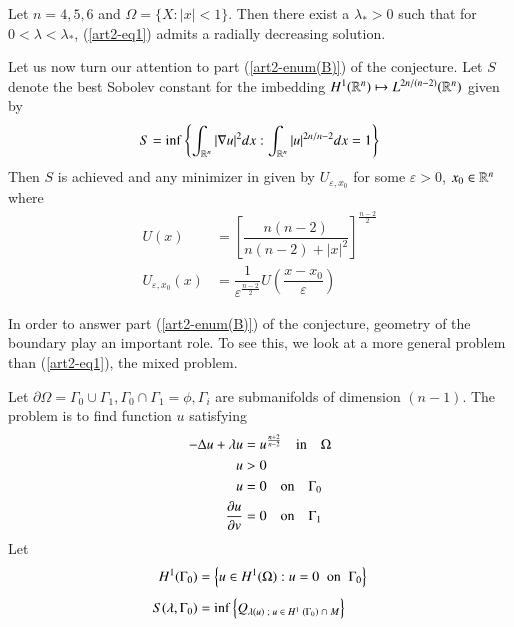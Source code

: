 \begin{theorem}\label{art2-thm3}
Let $n= 4, 5, 6$ and $\Omega = \{X: |x|< 1\}$. Then there exist a $\lambda_{*} > 0$ such that for $0 < \lambda < \lambda_{*}$, (\ref{art2-eq1}) admits a radially decreasing solution.

Let us now turn our attention to part (\ref{art2-enum(B)}) of the conjecture. Let $S$ denote the best Sobolev constant for the imbedding $H^{1}(\mathbb{R}^{n}) \mapsto  L^{2n/(n-2)}(\mathbb{R}^{n})$ given by  
\begin{equation}
S = {\rm inf}\left\{ \int_{\mathbb{R}^{n}} |\nabla u|^{2}dx: \int_{\mathbb{R}^{n}} |u|^{2n/n-2}dx =1 \right \}\label{art2-eq4}
\end{equation}
Then $S$ is achieved and any minimizer in given by $U_{\varepsilon, x_{0}}$ for some $\varepsilon > 0$, $x_{0} \in \mathbb{R}^{n}$ where
\begin{align}
U(x) &= \left[ \dfrac{n(n-2)}{n(n-2)+|x|^{2}}\right]^{\frac{n-2}{2}}\label{art2-eq5}\\
U_{\varepsilon, x_{0}}(x) &= \dfrac{1}{\varepsilon^{\frac{n-2}{2}}}U \left(\dfrac{x-x_{0}}{\varepsilon}\right)\label{art2-eq6}
\end{align}   
\end{theorem}

In order to answer part ({\ref{art2-enum(B)}}) of the conjecture, geometry of the boundary play an important role. To see this, we look at a more general problem than (\ref{art2-eq1}), the mixed problem.

Let $\partial \Omega = \Gamma_{0}\cup  \Gamma_{1}, \Gamma_{0} \cap \Gamma_{1} = \phi, \Gamma_{i}$ are submanifolds of dimension $(n-1)$. The problem is to find function $u$ satisfying
 \begin{align}
-\Delta u + \lambda u &= u ^{\frac{n+2}{n-2}} \quad {\rm in}\quad \Omega\nonumber\\
u &> 0 \nonumber\\
u &= 0 \quad {\rm on}\quad \Gamma_{0}\label {art2-eq7}\\
\dfrac{\partial u}{\partial v} &= 0 \quad {\rm on}  \quad\Gamma_{1} \nonumber     
 \end{align}
Let
\begin{align}
H^{1}(\Gamma_{0}) &= \left\{u \in H^{1}(\Omega) : u = 0\;\; {\rm on}\;\; \Gamma_{0}\right\}\label{art2-eq8}\\[4pt]
S(\lambda, \Gamma_{0}) &= {\rm inf}\left\{Q_{\lambda(u) \;; \;u \;\in\; H^{1}\; (\Gamma_{0})\; \cap\; M}\right\}\label{art2-eq9}
\end{align} 

